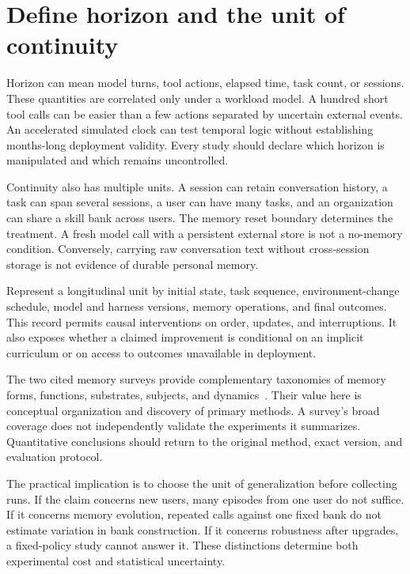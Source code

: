 \section{Define horizon and the unit of continuity}\label{sec:C27:horizon}
Horizon can mean model turns, tool actions, elapsed time, task count, or sessions. These quantities are correlated only under a workload model. A hundred short tool calls can be easier than a few actions separated by uncertain external events. An accelerated simulated clock can test temporal logic without establishing months-long deployment validity. Every study should declare which horizon is manipulated and which remains uncontrolled.

Continuity also has multiple units. A session can retain conversation history, a task can span several sessions, a user can have many tasks, and an organization can share a skill bank across users. The memory reset boundary determines the treatment. A fresh model call with a persistent external store is not a no-memory condition. Conversely, carrying raw conversation text without cross-session storage is not evidence of durable personal memory.

Represent a longitudinal unit by initial state, task sequence, environment-change schedule, model and harness versions, memory operations, and final outcomes. This record permits causal interventions on order, updates, and interruptions. It also exposes whether a claimed improvement is conditional on an implicit curriculum or on access to outcomes unavailable in deployment.

The two cited memory surveys provide complementary taxonomies of memory forms, functions, substrates, subjects, and dynamics~\cite{corpus251213564,corpus260206052}. Their value here is conceptual organization and discovery of primary methods. A survey's broad coverage does not independently validate the experiments it summarizes. Quantitative conclusions should return to the original method, exact version, and evaluation protocol.

The practical implication is to choose the unit of generalization before collecting runs. If the claim concerns new users, many episodes from one user do not suffice. If it concerns memory evolution, repeated calls against one fixed bank do not estimate variation in bank construction. If it concerns robustness after upgrades, a fixed-policy study cannot answer it. These distinctions determine both experimental cost and statistical uncertainty.

